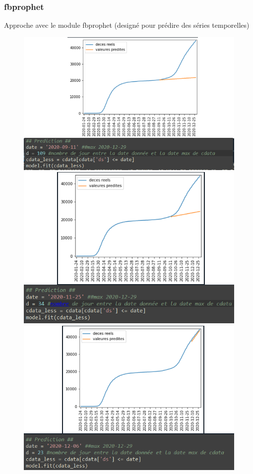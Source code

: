 \documentclass{beamer}
\begin{document}
\begin{frame}
	\frametitle{fbprophet}
	Approche avec le module fbprophet (designé pour prédire des séries temporelles)
	\begin{figure}[t]
		\begin{minipage}{0.3\textwidth}
			\includegraphics[scale=0.13]{fbprophet_avant_pt_dinflexion}
		\end{minipage}
		\begin{minipage}{0.3\textwidth}
			\includegraphics[scale=0.13]{fbprophet_mid_pt_dinflexion}
		\end{minipage}
		\begin{minipage}{0.3\textwidth}
			\includegraphics[scale=0.13]{fbprophet_apres_pt_dinflexion}

\end{minipage}
\end{figure}
\end{frame}
\end{document}
